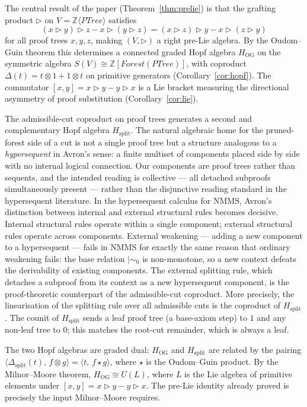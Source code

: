 \documentclass[11pt]{article}
\newcommand{\mszero}{\mathrel{\mid\!\sim_{0}}}
\newcommand{\PTree}{\mathit{PTree}}
\newcommand{\Forest}{\mathit{Forest}}
\newcommand{\ZZ}{\mathbb{Z}}
\begin{document}
\medskip

The central result of the paper (Theorem~\ref{thm:prelie}) is that the grafting product $\triangleright$ on $V = \ZZ\langle\PTree\rangle$ satisfies
\[
(x\triangleright y)\triangleright z - x\triangleright(y\triangleright z)
=
(x\triangleright z)\triangleright y - x\triangleright(z\triangleright y)
\]
for all proof trees $x,y,z$, making $(V,\triangleright)$ a right pre-Lie algebra.  By the Oudom--Guin theorem this determines a connected graded Hopf algebra $H_{\mathrm{OG}}$ on the symmetric algebra $S(V)\cong\ZZ[\Forest(\PTree)]$, with coproduct $\Delta(t)=t\otimes 1+1\otimes t$ on primitive generators (Corollary~\ref{cor:hopf}).  The commutator $[x,y]=x\triangleright y-y\triangleright x$ is a Lie bracket measuring the directional asymmetry of proof substitution (Corollary~\ref{cor:lie}).

\medskip

The admissible-cut coproduct on proof trees generates a second and complementary Hopf algebra $H_{\mathrm{split}}$.  The natural algebraic home for the pruned-forest side of a cut is not a single proof tree but a structure analogous to a \emph{hypersequent} in Avron's sense: a finite multiset of components placed side by side with no internal logical connection.  Our components are proof trees rather than sequents, and the intended reading is collective --- all detached subproofs simultaneously present --- rather than the disjunctive reading standard in the hypersequent literature.  In the hypersequent calculus for NMMS, Avron's distinction between internal and external structural rules becomes decisive.  Internal structural rules operate within a single component; external structural rules operate across components.  External weakening --- adding a new component to a hypersequent --- fails in NMMS for exactly the same reason that ordinary weakening fails: the base relation $\mszero$ is non-monotone, so a new context defeats the derivability of existing components.  The external splitting rule, which detaches a subproof from its context as a new hypersequent component, is the proof-theoretic counterpart of the admissible-cut coproduct.  More precisely, the linearisation of the splitting rule over all admissible cuts is the coproduct of $H_{\mathrm{split}}$.  The counit of $H_{\mathrm{split}}$ sends a leaf proof tree (a base-axiom step) to $1$ and any non-leaf tree to $0$; this matches the root-cut remainder, which is always a leaf.

The two Hopf algebras are graded dual: $H_{\mathrm{OG}}$ and $H_{\mathrm{split}}$ are related by the pairing $\langle\Delta_{\mathrm{split}}(t),\,f\otimes g\rangle = \langle t,\,f\star g\rangle$, where $\star$ is the Oudom--Guin product.  By the Milnor--Moore theorem, $H_{\mathrm{OG}}\cong U(L)$, where $L$ is the Lie algebra of primitive elements under $[x,y]=x\triangleright y-y\triangleright x$.  The pre-Lie identity already proved is precisely the input Milnor--Moore requires.
\end{document}
